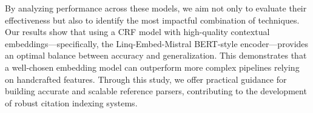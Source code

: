 By analyzing performance across these models, we aim not only to evaluate their effectiveness but also to identify the most impactful combination of techniques. Our results show that using a CRF model with high-quality contextual embeddings—specifically, the Linq-Embed-Mistral BERT-style encoder—provides an optimal balance between accuracy and generalization. This demonstrates that a well-chosen embedding model can outperform more complex pipelines relying on handcrafted features. Through this study, we offer practical guidance for building accurate and scalable reference parsers, contributing to the development of robust citation indexing systems.


